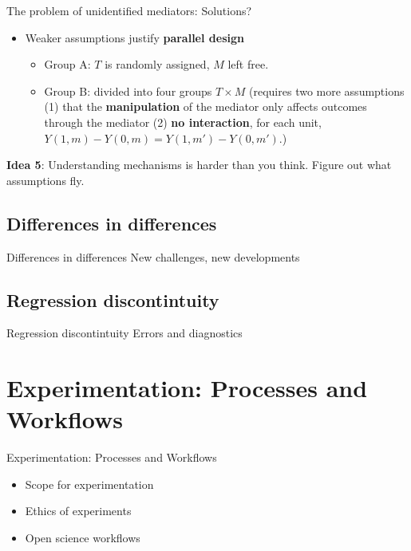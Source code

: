 \documentclass[
  11pt,
  ignorenonframetext,
]{beamer}
\providecommand{\tightlist}{%
  \setlength{\itemsep}{0pt}\setlength{\parskip}{0pt}}\usepackage{longtable,booktabs,array}
\begin{document}
\begin{frame}{The problem of unidentified mediators: Solutions?}
\protect\hypertarget{the-problem-of-unidentified-mediators-solutions-1}{}
\begin{itemize}
\tightlist
\item
  Weaker assumptions justify \textbf{parallel design}

  \begin{itemize}
  \tightlist
  \item
    Group A: \(T\) is randomly assigned, \(M\) left free.
  \item
    Group B: divided into four groups \(T\times M\) (requires two more
    assumptions (1) that the \textbf{manipulation} of the mediator only
    affects outcomes through the mediator (2) \textbf{no interaction},
    for each unit, \(Y(1,m)-Y(0,m) = Y(1,m')-Y(0,m')\).)
  \end{itemize}
\end{itemize}

\textbf{Idea 5}: Understanding mechanisms is harder than you think.
Figure out what assumptions fly.
\end{frame}

\hypertarget{differences-in-differences}{%
\subsection{Differences in
differences}\label{differences-in-differences}}

\begin{frame}{Differences in differences}
New challenges, new developments
\end{frame}

\hypertarget{regression-discontintuity}{%
\subsection{Regression discontintuity}\label{regression-discontintuity}}

\begin{frame}{Regression discontintuity}
Errors and diagnostics
\end{frame}

\hypertarget{openscience}{%
\section{Experimentation: Processes and Workflows}\label{openscience}}

\begin{frame}{Experimentation: Processes and Workflows}
\begin{itemize}
\tightlist
\item
  Scope for experimentation
\item
  Ethics of experiments
\item
  Open science workflows
\end{itemize}
\end{frame}
\end{document}
